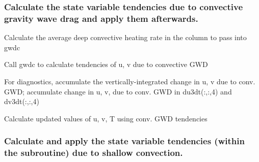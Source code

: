 \subsubsection*{Calculate the state variable tendencies due to convective gravity wave drag and apply them afterwards.}


\begin{DoxyItemize}
\item Calculate the average deep convective heating rate in the column to pass into \textquotesingle{}gwdc\textquotesingle{}
\item Call \textquotesingle{}gwdc\textquotesingle{} to calculate tendencies of u, v due to convective G\+WD
\item For diagnostics, accumulate the vertically-\/integrated change in u, v due to conv. G\+WD; accumulate change in u, v, due to conv. G\+WD in du3dt(\+:,\+:,4) and dv3dt(\+:,\+:,4)
\item Calculate updated values of u, v, T using conv. G\+WD tendencies
\end{DoxyItemize}

\subsubsection*{Calculate and apply the state variable tendencies (within the subroutine) due to shallow convection.}


